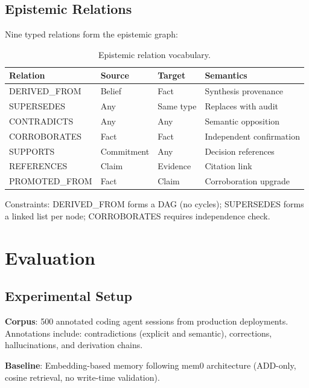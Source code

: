 \documentclass[11pt,letterpaper]{article}
\begin{document}
\subsection{Epistemic Relations}

Nine typed relations form the epistemic graph:

\begin{table}[H]
\centering
\caption{Epistemic relation vocabulary.}
\label{tab:relations}
\begin{tabular}{@{}llll@{}}
\toprule
\textbf{Relation} & \textbf{Source} & \textbf{Target} & \textbf{Semantics} \\
\midrule
DERIVED\_FROM & Belief & Fact & Synthesis provenance \\
SUPERSEDES & Any & Same type & Replaces with audit \\
CONTRADICTS & Any & Any & Semantic opposition \\
CORROBORATES & Fact & Fact & Independent confirmation \\
SUPPORTS & Commitment & Any & Decision references \\
REFERENCES & Claim & Evidence & Citation link \\
PROMOTED\_FROM & Fact & Claim & Corroboration upgrade \\
\bottomrule
\end{tabular}
\end{table}

Constraints: DERIVED\_FROM forms a DAG (no cycles); SUPERSEDES forms a linked list per node; CORROBORATES requires independence check.

\section{Evaluation}
\label{sec:eval}

\subsection{Experimental Setup}

\textbf{Corpus}: 500 annotated coding agent sessions from production deployments. Annotations include: contradictions (explicit and semantic), corrections, hallucinations, and derivation chains.

\textbf{Baseline}: Embedding-based memory following mem0 architecture (ADD-only, cosine retrieval, no write-time validation).
\end{document}
